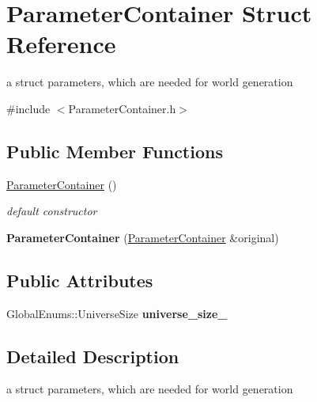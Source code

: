 \hypertarget{struct_parameter_container}{\section{Parameter\-Container Struct Reference}
\label{struct_parameter_container}
}


a struct parameters, which are needed for world generation  




{\ttfamily \#include $<$Parameter\-Container.\-h$>$}

\subsection*{Public Member Functions}
\begin{DoxyCompactItemize}
\item 
\hyperlink{struct_parameter_container_acf7a05b68a524c8427edf954efd675bb}{Parameter\-Container} ()
\begin{DoxyCompactList}\small\item\em default constructor \end{DoxyCompactList}\item 
\hypertarget{struct_parameter_container_ac7fa0076a1a8aa5c256640922ac1983f}{{\bfseries Parameter\-Container} (\hyperlink{struct_parameter_container}{Parameter\-Container} \&original)}\label{struct_parameter_container_ac7fa0076a1a8aa5c256640922ac1983f}

\end{DoxyCompactItemize}
\subsection*{Public Attributes}
\begin{DoxyCompactItemize}
\item 
Global\-Enums\-::\-Universe\-Size {\bfseries universe\-\_\-size\-\_\-}
\end{DoxyCompactItemize}


\subsection{Detailed Description}
a struct parameters, which are needed for world generation 

